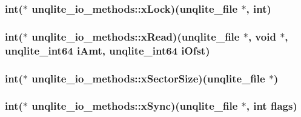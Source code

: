 \hypertarget{structunqlite__io__methods_a7a7becb00dc7817bf421b8623da5554e}{
\subsubsection[{x\-Lock}]{\setlength{\rightskip}{0pt plus 5cm}int($\ast$ unqlite\-\_\-io\-\_\-methods\-::x\-Lock)({\bf unqlite\-\_\-file} $\ast$, int)}}\label{d6/d9e/structunqlite__io__methods_a7a7becb00dc7817bf421b8623da5554e}
\hypertarget{structunqlite__io__methods_a591d297aaa1317f4d9af5b14d19c9fe3}{
\subsubsection[{x\-Read}]{\setlength{\rightskip}{0pt plus 5cm}int($\ast$ unqlite\-\_\-io\-\_\-methods\-::x\-Read)({\bf unqlite\-\_\-file} $\ast$, void $\ast$, {\bf unqlite\-\_\-int64} i\-Amt, {\bf unqlite\-\_\-int64} i\-Ofst)}}\label{d6/d9e/structunqlite__io__methods_a591d297aaa1317f4d9af5b14d19c9fe3}
\hypertarget{structunqlite__io__methods_a2e2302c2aa9f8ad6e5e53538932eca73}{
\subsubsection[{x\-Sector\-Size}]{\setlength{\rightskip}{0pt plus 5cm}int($\ast$ unqlite\-\_\-io\-\_\-methods\-::x\-Sector\-Size)({\bf unqlite\-\_\-file} $\ast$)}}\label{d6/d9e/structunqlite__io__methods_a2e2302c2aa9f8ad6e5e53538932eca73}
\hypertarget{structunqlite__io__methods_a8d76f86e674afc917e737a0fa8e4afb0}{
\subsubsection[{x\-Sync}]{\setlength{\rightskip}{0pt plus 5cm}int($\ast$ unqlite\-\_\-io\-\_\-methods\-::x\-Sync)({\bf unqlite\-\_\-file} $\ast$, int flags)}}\label{d6/d9e/structunqlite__io__methods_a8d76f86e674afc917e737a0fa8e4afb0}
